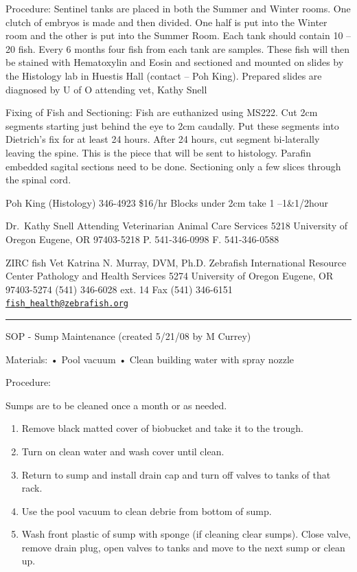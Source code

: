 \documentclass[
]{book}
\providecommand{\tightlist}{%
  \setlength{\itemsep}{0pt}\setlength{\parskip}{0pt}}
\begin{document}
Procedure:
Sentinel tanks are placed in both the Summer and Winter rooms. One clutch of embryos is made and then divided. One half is put into the Winter room and the other is put into the Summer Room. Each tank should contain 10 --20 fish. Every 6 months four fish from each tank are samples. These fish will then be stained with Hematoxylin and Eosin and sectioned and mounted on slides by the Histology lab in Huestis Hall (contact -- Poh King). Prepared slides are diagnosed by U of O attending vet, Kathy Snell

Fixing of Fish and Sectioning:
Fish are euthanized using MS222. Cut 2cm segments starting just behind the eye to 2cm caudally. Put these segments into Dietrich's fix for at least 24 hours. After 24 hours, cut segment bi-laterally leaving the spine. This is the piece that will be sent to histology. Parafin embedded sagital sections need to be done. Sectioning only a few slices through
the spinal cord.

Poh King (Histology)
346-4923
\$16/hr Blocks under 2cm take 1 --1\&1/2hour

Dr.~Kathy Snell
Attending Veterinarian
Animal Care Services
5218 University of Oregon
Eugene, OR 97403-5218
P. 541-346-0998
F. 541-346-0588

ZIRC fish Vet
Katrina N. Murray, DVM, Ph.D.
Zebrafish International Resource Center
Pathology and Health Services
5274 University of Oregon
Eugene, OR 97403-5274
(541) 346-6028 ext. 14
Fax (541) 346-6151
\href{mailto:fish_health@zebrafish.org}{\nolinkurl{fish\_health@zebrafish.org}}

\begin{center}\rule{0.5\linewidth}{0.5pt}\end{center}

SOP - Sump Maintenance
(created 5/21/08 by M Currey)

Materials:
• Pool vacuum
• Clean building water with spray nozzle

Procedure:

Sumps are to be cleaned once a month or as needed.

\begin{enumerate}
\def\labelenumi{\arabic{enumi}.}
\tightlist
\item
  Remove black matted cover of biobucket and take it to the trough.
\item
  Turn on clean water and wash cover until clean.
\item
  Return to sump and install drain cap and turn off valves to tanks of that rack.
\item
  Use the pool vacuum to clean debrie from bottom of sump.\\
\item
  Wash front plastic of sump with sponge (if cleaning clear sumps). Close valve, remove drain plug, open valves to tanks and move to the next sump or clean up.
\end{enumerate}
\end{document}
